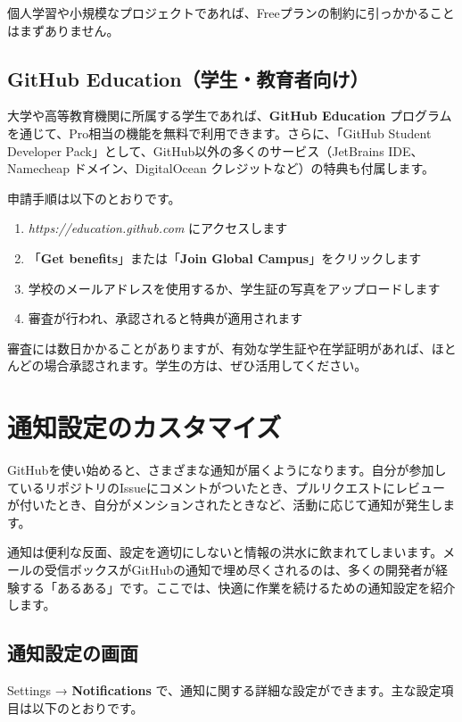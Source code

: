 個人学習や小規模なプロジェクトであれば、Freeプランの制約に引っかかることはまずありません。

\subsection{GitHub Education（学生・教育者向け）}

大学や高等教育機関に所属する学生であれば、\textbf{GitHub Education} プログラムを通じて、Pro相当の機能を無料で利用できます。さらに、「GitHub Student Developer Pack」として、GitHub以外の多くのサービス（JetBrains IDE、Namecheap ドメイン、DigitalOcean クレジットなど）の特典も付属します。

申請手順は以下のとおりです。

\begin{enumerate}
  \item \textit{https://education.github.com} にアクセスします
  \item 「\textbf{Get benefits}」または「\textbf{Join Global Campus}」をクリックします
  \item 学校のメールアドレスを使用するか、学生証の写真をアップロードします
  \item 審査が行われ、承認されると特典が適用されます
\end{enumerate}

審査には数日かかることがありますが、有効な学生証や在学証明があれば、ほとんどの場合承認されます。学生の方は、ぜひ活用してください。

\section{通知設定のカスタマイズ}

GitHubを使い始めると、さまざまな通知が届くようになります。自分が参加しているリポジトリのIssueにコメントがついたとき、プルリクエストにレビューが付いたとき、自分がメンションされたときなど、活動に応じて通知が発生します。

通知は便利な反面、設定を適切にしないと情報の洪水に飲まれてしまいます。メールの受信ボックスがGitHubの通知で埋め尽くされるのは、多くの開発者が経験する「あるある」です。ここでは、快適に作業を続けるための通知設定を紹介します。

\subsection{通知設定の画面}

Settings → \textbf{Notifications} で、通知に関する詳細な設定ができます。主な設定項目は以下のとおりです。

